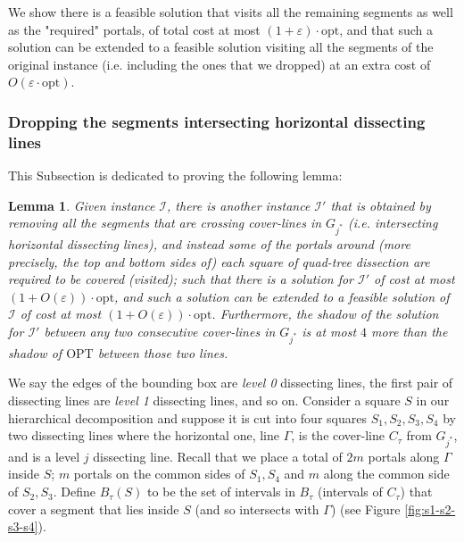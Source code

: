 \documentclass[pdflatex,sn-mathphys-num]{sn-jnl}
\theoremstyle{thmstyleone}
\newtheorem{lemma}{Lemma}
\newcommand{\eps}{\varepsilon}
\newcommand{\opt}{{\text{opt}}}
\newcommand{\OPT}{{\text{OPT}}}
\begin{document}
We show there is a feasible solution that visits all the remaining segments as well as the "required" portals, of total cost at most $(1+\eps)\cdot\opt$, and that such a solution can be extended to a feasible solution visiting all the segments of the original instance (i.e. including the ones that we dropped) at an extra cost of $O(\eps\cdot\opt)$.

\subsubsection[Dropping the Segments hitting the Dissecting Lines]{Dropping the segments intersecting horizontal dissecting lines}\label{subsec:dropping-horizontal}

This Subsection is dedicated to proving the following lemma:

\begin{lemma}\label{lemma:horizontal-cover-lines}
    Given instance $\mathcal I$, there is another instance $\mathcal I'$ that is obtained by removing all the segments that are crossing cover-lines in $G_{j^*}$ (i.e. intersecting horizontal dissecting lines),
    and instead some of the portals around (more precisely, the top and bottom sides of) 
    each square of quad-tree dissection are required to be covered (visited); such that there is a solution for 
    $\mathcal I'$ of cost at most $(1+O(\eps))\cdot\opt$, and such a solution can be extended to a feasible solution of $\mathcal I$ of cost at most $(1+O(\eps))\cdot\opt$. Furthermore, the shadow of the solution for $\mathcal I'$
    between any two consecutive cover-lines in $G_{j^*}$ is at most
    $4$ more than the shadow of $\OPT$ between those two lines.
\end{lemma}

We say the edges of the bounding box are {\em level 0} dissecting lines, the first pair of dissecting lines are {\em level 1} dissecting lines, and so on.
Consider a square $S$ in our hierarchical decomposition and suppose
it is cut into four squares $S_1,S_2,S_3,S_4$ by two dissecting lines
where the horizontal one, line $\Gamma$, is the cover-line $C_\tau$ from $G_{j^*}$, 
and is a level $j$ dissecting line.
Recall that we place a total of $2m$ portals 
along $\Gamma$ inside $S$; $m$ portals on the common sides of $S_1,S_4$ and $m$ along the common side of $S_2,S_3$.
Define $B_\tau(S)$ to be the set of intervals in $B_\tau$ (intervals of $C_\tau$)
that cover a segment that lies inside $S$ (and so intersects with $\Gamma$) (see Figure \ref{fig:s1-s2-s3-s4}).
\end{document}

